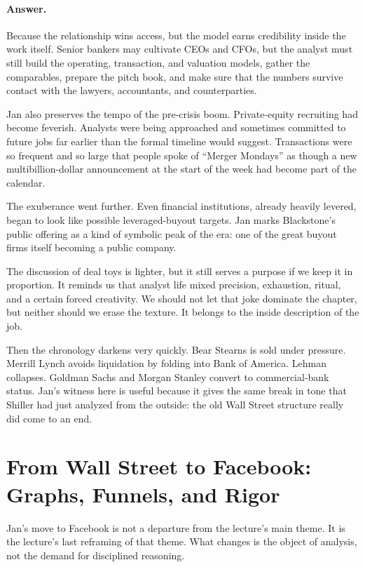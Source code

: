 \paragraph{Answer.} Because the relationship wins access, but the model earns credibility inside the work itself. Senior bankers may cultivate CEOs and CFOs, but the analyst must still build the operating, transaction, and valuation models, gather the comparables, prepare the pitch book, and make sure that the numbers survive contact with the lawyers, accountants, and counterparties.

Jan also preserves the tempo of the pre-crisis boom. Private-equity recruiting had become feverish. Analysts were being approached and sometimes committed to future jobs far earlier than the formal timeline would suggest. Transactions were so frequent and so large that people spoke of ``Merger Mondays'' as though a new multibillion-dollar announcement at the start of the week had become part of the calendar.

The exuberance went further. Even financial institutions, already heavily levered, began to look like possible leveraged-buyout targets. Jan marks Blackstone's public offering as a kind of symbolic peak of the era: one of the great buyout firms itself becoming a public company.

The discussion of deal toys is lighter, but it still serves a purpose if we keep it in proportion. It reminds us that analyst life mixed precision, exhaustion, ritual, and a certain forced creativity. We should not let that joke dominate the chapter, but neither should we erase the texture. It belongs to the inside description of the job.

Then the chronology darkens very quickly. Bear Stearns is sold under pressure. Merrill Lynch avoids liquidation by folding into Bank of America. Lehman collapses. Goldman Sachs and Morgan Stanley convert to commercial-bank status. Jan's witness here is useful because it gives the same break in tone that Shiller had just analyzed from the outside: the old Wall Street structure really did come to an end.

\section{From Wall Street to Facebook: Graphs, Funnels, and Rigor}

Jan's move to Facebook is not a departure from the lecture's main theme. It is the lecture's last reframing of that theme. What changes is the object of analysis, not the demand for disciplined reasoning.

